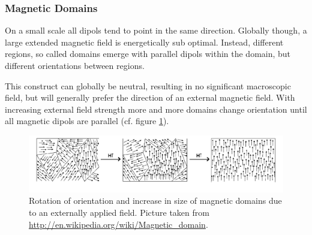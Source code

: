 \documentclass[a4paper]{scrartcl}
\numberwithin{equation}{section}
\numberwithin{figure}{section}
\numberwithin{table}{section}
\begin{document}
\subsubsection*{Magnetic Domains}
On a small scale all dipols tend to point in the same direction. Globally though, a large extended magnetic field is energetically sub optimal. Instead, different regions, so called domains emerge with parallel dipols within the domain, but different orientations between regions.

This construct can globally be neutral, resulting in no significant macroscopic field, but will generally prefer the direction of an external magnetic field. With increasing external field strength more and more domains change orientation until all magnetic dipols are parallel (cf. figure \ref{fig:doms}).
\begin{figure}
        \begin{center}
        		\includegraphics[width=0.9\linewidth]{img/Dominios.pdf}
        \end{center}
        \caption{
			\small Rotation of orientation and increase in size of magnetic domains due to an externally applied field. Picture taken from \url{http://en.wikipedia.org/wiki/Magnetic_domain}.
        }
        \label{fig:doms}
\end{figure}
\end{document}
